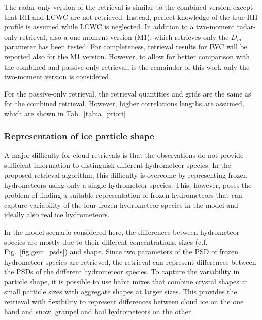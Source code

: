 \documentclass[journal abbreviation, manuscript]{copernicus}
\begin{document}
The radar-only version of the retrieval is similar to the combined version
except that RH and LCWC are not retrieved. Instead, perfect knowledge of the
true RH profile is assumed while LCWC is neglected. In addition to a two-moment
radar-only retrieval, also a one-moment version (M1), which retrieves only the
$D_m$ parameter has been tested. For completeness, retrieval results for IWC
will be reported also for the M1 version. However, to allow for better comparison
with the combined and passive-only retrieval, is the remainder of this work
only the two-moment version is considered.

For the passive-only retrieval, the retrieval quantities and grids are the same
as for the combined retrieval. However, higher correlations lengths are assumed,
which are shown in Tab.~\ref{tab:a_priori}

\subsubsection{Representation of ice particle shape}
\label{sec:method:partilce_models}

A major difficulty for cloud retrievals is that the observations do not provide
sufficient information to distinguish different hydrometeor species. In the
proposed retrieval algorithm, this difficulty is overcome by representing frozen
hydrometeors using only a single hydrometeor species. This, however, poses the
problem of finding a suitable representation of frozen hydrometeors that can
capture variability of the four frozen hydrometeor species in the model and
ideally also real ice hydrometeors.

In the model scenario considered here, the differences between hydrometeor
species are mostly due to their different concentrations, sizes (c.f.
Fig.~\ref{fig:gem_psds}) and shape. Since two parameters of the PSD of frozen
hydrometeor species are retrieved, the retrieval can represent differences
between the PSDs of the different hydrometeor species. To capture the
variability in particle shape, it is possible to use habit mixes that combine
crystal shapes at small particle sizes with aggregate shapes at larger sizes.
This provides the retrieval with flexibility to represent differences between
cloud ice on the one hand and snow, graupel and hail hydrometeors on the other.
\end{document}
